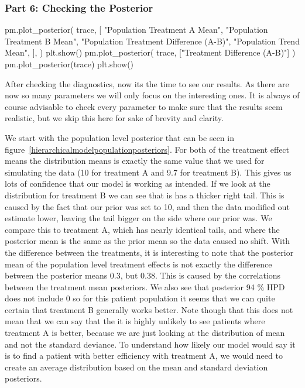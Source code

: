 \documentclass[12pt,a4paper,leqno]{report}
\theoremstyle{plain}
\theoremstyle{definition}
\theoremstyle{remark}
\begin{document}
\subsubsection*{Part 6: Checking the Posterior}

\bigskip
\begin{pyverbatim}[][fontsize=\footnotesize]
    pm.plot_posterior(
        trace,
        [
            "Population Treatment A Mean",
            "Population Treatment B Mean",
            "Population Treatment Difference (A-B)",
            "Population Trend Mean",
        ],
    )
    plt.show()
    pm.plot_posterior(
        trace, ["Treatment Difference (A-B)"]
    )
    pm.plot_posterior(trace)
    plt.show()
\end{pyverbatim}
\bigskip

After checking the diagnostics, now its the time to see our results. As there are
now so many parameters we will only focus on the interesting ones. It is always of
course advisable to check every parameter to make sure that the results seem realistic,
but we skip this here for sake of brevity and clarity.

We start with the population level posterior that can be seen in figure\
\ref{hierarchicalmodelpopulationposteriors}. For both of the treatment effect means the
distribution means is exactly the same value that we used for simulating the data (10
for treatment A and 9.7 for treatment B). This gives us lots of confidence that our
model is working as intended. If we look at the distribution for treatment B we can see
that is has a thicker right tail. This is caused by the fact that our prior was set to
10, and then the data modified out estimate lower, leaving the tail bigger on the side
where our prior was. We compare this to treatment A, which has nearly identical
tails, and where the posterior mean is the same as the prior mean so the data caused no
shift. With the difference between the treatments, it is interesting to note that the
posterior mean of the population level treatment effects is not exactly the difference
between the posterior means 0.3, but 0.38. This is caused by the correlations between
the treatment mean posteriors. We also see that posterior 94 \% HPD does not include 0
so for this patient population it seems that we can quite certain that treatment B
generally works better. Note though that this does not mean that we can say that the it is highly
unlikely to see patients where treatment A is better, because we are just looking at the
distribution of mean and not the standard deviance. To understand how likely our model
would say it is to find a patient with better efficiency with treatment A, we would need
to create an average distribution based on the mean and standard deviation posteriors.
\end{document}
